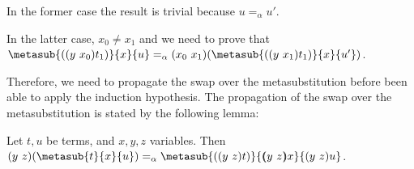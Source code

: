 \begin{coqdoccode}
\end{coqdoccode}
In the former case the result is trivial because $u =_\alpha u'$. 
\begin{coqdoccode}
\end{coqdoccode}
In the latter case, $x_0 \neq x_1$ and we need to prove that $\metasub{(\swap{y}{x_0}{t_1})}{x}{u} =_\alpha \swap{x_0}{x_1}{(\metasub{(\swap{y}{x_1}{t_1})}{x}{u'})}$.
\begin{coqdoccode}
\end{coqdoccode}
Therefore, we need to propagate the swap over the metasubstitution before been able to apply the induction hypothesis. The propagation of the swap over the metasubstitution is stated by the following lemma:


\begin{lemma} Let $t,u$ be terms, and $x,y,z$ variables. Then
 $\swap{y}{z}{(\metasub{t}{x}{u})} =_\alpha \metasub{(\swap{y}{z}{t})}{\vswap{y}{z}{x}}{\swap{y}{z}{u}}$.
\end{lemma}


